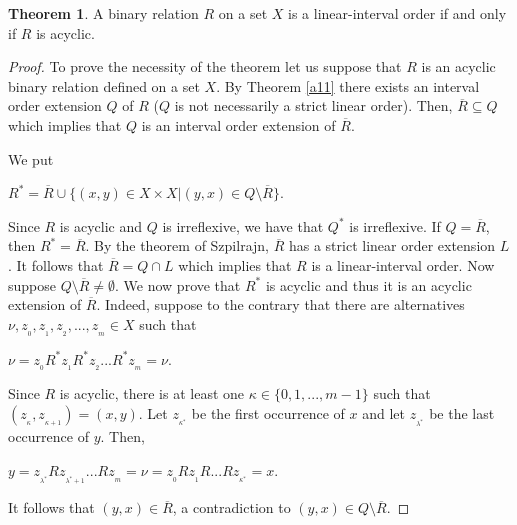 \documentclass{article}
\theoremstyle{definition}
\newtheorem{theorem}{Theorem}[section]
\begin{document}
\begin{theorem}\label{awer}{\rm 
A binary relation $R$ on a set $X$ is a
linear-interval
order 
if and only if $R$ is acyclic.}
\end{theorem}
\begin{proof}
To prove the necessity of the theorem let us suppose
that $R$ is an acyclic binary relation defined on a set $X$.
By Theorem \ref{a11} there exists an 
interval order extension $Q$ of $R$ ($Q$ is not necessarily a strict linear order).
Then, $\overline{R}\subseteq Q$ which implies that $Q$ is 
an 
interval order extension of $\overline{R}$.

We put
\begin{center}
$R^{\ast}=\overline{R}\cup\{(x,y)\in X\times X \vert
(y,x)\in {Q\setminus \overline{R}}\}.$
\end{center}
Since $R$ is acyclic and $Q$ is irreflexive, we have that $Q^{\ast}$ is irreflexive.
If $Q=\overline{R}$, then $R^{\ast}=\overline{R}$.
By the theorem of Szpilrajn, $\overline{R}$ has a strict linear order extension $L$.
It follows that $\overline{R}=Q\cap L$ which implies that $R$ is a 
linear-interval order.
Now suppose $Q\setminus \overline{R}\neq \emptyset$. 
We now prove that
$R^{\ast}$ is acyclic and thus it is an acyclic extension
of $\overline{R}$.
Indeed, suppose to the contrary that 
there are alternatives
$\nu, z_{_0},z_{_1},z_{_2},...,z_{_m}\in X$ such that
\begin{center}
$\nu=z_{_0}R^{\ast} z_{_1}R^{\ast}z_{_2}...R^{\ast}z_{_m}=\nu.$
\end{center}
Since $R$ is 
acyclic, there is at least one $\kappa\in \{0,1,...,m-1\}$ such that
$(z_{_\kappa},z_{_{\kappa+1}})=(x,y)$.
Let $z_{_{\kappa^{\ast}}}$ be the first occurrence of $x$ and let $z_{_{\lambda^{\ast}}}$ be the last occurrence of $y$. 
Then,
\begin{center}
$y=z_{_{\lambda^{\ast}}}R z_{_{{\lambda^{\ast}+1}}}...Rz_{_m}=\nu=z_{_0}Rz_{_1}R...Rz_{_{\kappa^{\ast}}}=x$.
\end{center}
It follows that $(y,x)\in\overline{R}$, a contradiction to $(y,x)\in Q\setminus \overline{R}$.


\end{proof}
\end{document}
